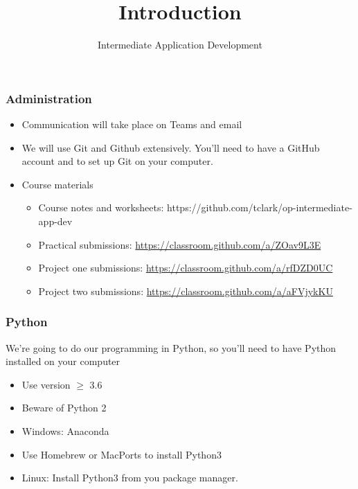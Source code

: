 \documentclass[10pt]{beamer}
\title{Introduction}
\author[IN608]{Intermediate Application Development}
\institute[Otago Polytechnic]{
  Otago Polytechnic \\
  Dunedin, New Zealand \\
  Kaiako: Tom Clark
}
\date{}
\begin{document}
\begin{frame}[plain]
  \titlepage
\end{frame}

\begin{frame}
  \frametitle{Administration}
      
   \begin{itemize}
     \item Communication will take place on Teams and email
     \item We will use Git and Github extensively. You'll need to have a GitHub account and 
     to set up Git on your computer.
     \item Course materials
       \begin{itemize}
         \item Course notes and worksheets: https://github.com/tclark/op-intermediate-app-dev
         \item Practical submissions: \url{https://classroom.github.com/a/ZOav9L3E}
         \item Project one submissions:  \url{https://classroom.github.com/a/rfDZD0UC}
         \item Project two submissions: \url{https://classroom.github.com/a/aFVjykKU}
       \end{itemize}
   \end{itemize}
      
\end{frame}



\begin{frame}
  \frametitle{Python}

   We're going to do our programming in Python, so you'll need to 
   have Python installed on your computer
   
   \begin{itemize}
     \item Use version $\geq$ 3.6
     \item Beware of Python 2
     \item Windows: Anaconda
     \item Use Homebrew or MacPorts to install Python3
     \item Linux: Install Python3 from you package manager.
   \end{itemize}
\end{frame}
\end{document}
